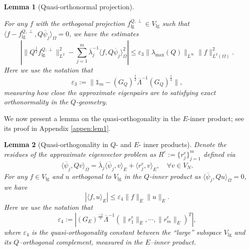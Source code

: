\documentclass[11pt,a4paper]{article}
\numberwithin{equation}{section}
\newcommand{\Epsilon}{\mathrm{E}}
\newcommand{\assign}{:=}
\newcommand{\tmop}[1]{\ensuremath{\operatorname{#1}}}
\newtheorem{lemma}{Lemma}
\begin{document}
\begin{lemma}[Quasi-orthonormal projection]
  \label{lem:quasi ort}
 
  
  For any $f$ with the orthogonal projection $f^{Q,\perp}_{\tmop{lg}}\in V_{\tmop{lg}}$ such that $\langle f-f^{Q,\perp}_{\tmop{lg}},Q\overline\psi_j\rangle_{\Omega}=0$,   we have the estimates \begin{equation}
      |\|Q^{\frac{1}{2}}f^{Q,\perp}_{\tmop{lg}}\|^2_{L^2}-\sum_{j = 1}^m \overline\lambda_j^{-1} \langle f, Q\overline\psi_j \rangle_{\Omega} ^2|\leqslant \varepsilon_3\| \lambda_{\max} (Q) \|_{L^\infty}\|f\|^2_{{L^2}(\Omega)}.\label{fn 1}
  \end{equation}
  Here we use the notation that \begin{equation}
  \label{def-eps3}
  \varepsilon_3\assign \|\mathbb{1}_{m}-(G_Q)^{\frac{1}{2}}\overline\Lambda^{-1}(G_Q)^{\frac{1}{2}}\|,
  \end{equation}
measuring how close the approximate eigenpairs are to satisfying exact orthonormality in the $Q$-geometry.
  \end{lemma}
  We now present a lemma on the quasi-orthogonality in the $E$-inner product; see its proof in Appendix \ref{appen:lem1}.
  \begin{lemma}[Quasi-orthogonality in $Q$- and $E$- inner products]
  \label{lem:quasi ort1}
  Denote the residues of the approximate eigenvector problem as $R^e\assign\{r^e_j\}_{j=1}^m$ defined via $$\langle \overline\psi_j, Q v \rangle_{\Omega} = \overline\lambda_j \langle \overline\psi_j, v \rangle_{E}+\langle r^e_j, v \rangle_{E},\quad \forall v\in V_N.$$
  For any $f\in V_{\tmop{lg}}$ and $u$ orthogonal to $V_{\tmop{lg}}$ in the $Q$-inner product as $\langle \overline\psi_j, Q u\rangle_{\Omega}=0$, we have \[|\langle f, u \rangle_{E}|\leqslant\varepsilon_4\|f\|_{E}\|u\|_{E}.\]
  Here we use the notation that \begin{equation*}
  \label{def-eps4}
  \varepsilon_4\assign |(G_E)^{\frac{-1}{2}}\overline\Lambda^{{-1}}(\|r^e_1\|_{E},\cdots,\|r^e_m\|_{E})^T|,
  \end{equation*}
where
$\varepsilon_4$ is the quasi-orthogonality constant between the ``large'' subspace
$V_{\mathrm{lg}}$ and its $Q$--orthogonal complement,
\emph{measured in the $E$--inner product}. 
  \end{lemma}
    
\end{document}
